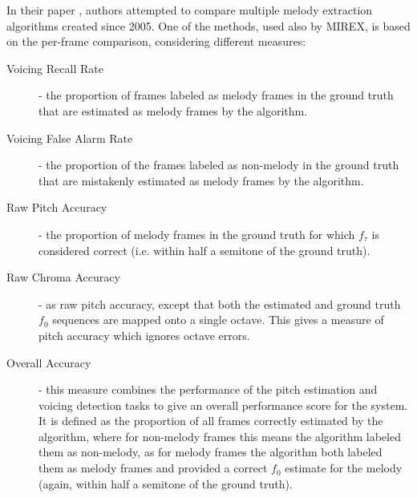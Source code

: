 In their paper \cite{comparison}, authors attempted to compare multiple melody extraction algorithms created since 2005. One of the methods, used also by MIREX, is based on the per-frame comparison, considering different measures:


\begin{description}
\item[Voicing Recall Rate] - the proportion of frames labeled as melody frames in the ground truth that are estimated as melody frames by the algorithm.
\item[Voicing False Alarm Rate] - the proportion of the frames labeled as non-melody in the ground truth that are mistakenly estimated as melody frames by the algorithm.
\item[Raw Pitch Accuracy] - the proportion of melody frames in the ground truth for which $f_{\tau}$ is considered correct (i.e. within half a semitone of the ground truth). 
\item[Raw Chroma Accuracy] - as raw pitch accuracy, except that both the estimated and ground truth $f_{0}$ sequences are mapped onto a single octave. This gives a measure of pitch accuracy which ignores octave errors.
\item[Overall Accuracy] - this measure combines the performance of the pitch estimation and voicing detection tasks to give an overall performance score for the system. It is defined as the proportion of all frames correctly estimated by the algorithm, where for non-melody frames this means the algorithm labeled them as non-melody, as for melody frames the algorithm both labeled them as melody frames and provided a correct $f_{0}$ estimate for the melody (again, within half a semitone of the ground truth).
\end{description}


